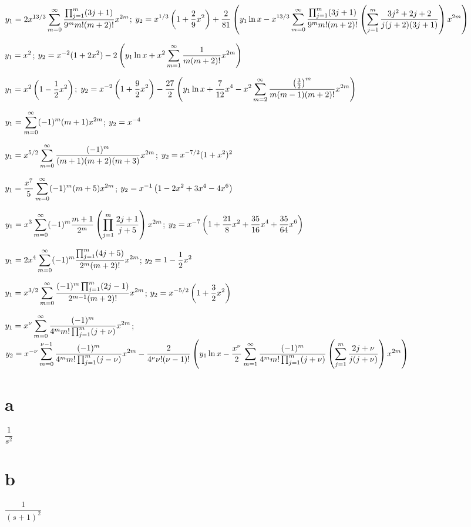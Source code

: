 $\displaystyle{y_1=2x^{13/3}\sum_{m=0}^\infty\frac{\prod_{j=1}^m(3j+1)}{9^mm!(m+2)!}x^{2m}}$;\;
$\displaystyle{y_2=x^{1/3}\left(1+\frac{2}{9}x^2\right)+\frac{2}{81}\left(
y_1\ln
x-x^{13/3}\sum_{m=0}^\infty\frac{\prod_{j=1}^m(3j+1)}{9^mm!(m+2)!}
\left(\sum_{j=1}^m\frac{3j^2+2j+2}{j(j+2)(3j+1)}\right)x^{2m}\right)}$

$\displaystyle{y_1=x^2}$;\;
$\displaystyle{y_2=x^{-2}(1+2x^2)-2\left(y_1\ln x+x^2\sum_{m=1}^\infty\frac{1}{m(m+2)!}x^{2m}\right)}$

$\displaystyle{y_1=x^2\left(1-\frac{1}{2}x^2\right)}$;\;
$\displaystyle{y_2=x^{-2}\left(1+\frac{9}{2}x^2\right)-\frac{27}{2}\left(
y_1\ln x+\frac{7}{12}x^4-x^2\sum_{m=2}^\infty\frac{\left(\frac32\right)^m
}{m(m-1)(m+2)!}x^{2m}\right)}$

$y_1=\displaystyle{\sum_{m=0}^\infty(-1)^m(m+1)x^{2m}}$;\;
$y_2=\displaystyle{x^{-4}}$

$y_1=\displaystyle{x^{5/2}\sum_{m=0}^\infty\frac{(-1)^m}{(m+1)(m+2)(m+3)}x^{2m}}$;\;
$y_2=\displaystyle{x^{-7/2}(1+x^2)^2}$

$y_1=\displaystyle\frac{x^7}{5}\sum_{m=0}^\infty(-1)^m(m+5)x^{2m}$;\;
$y_2=\displaystyle{x^{-1}\left(1-2x^2+3x^4-4x^6\right)}$

$y_1=\displaystyle{x^3\sum_{m=0}^\infty(-1)^m\frac{m+1}{2^m}\left(\prod_{j=1}^m\frac{2j+1}{j+5}\right)x^{2m}}$;\;
$y_2=\displaystyle{x^{-7}\left(1+\frac{21}{8}x^2+\frac{35}{16}x^4+\frac{35}{64}x^6\right)}$

$y_1=\displaystyle{2x^4\sum_{m=0}^\infty(-1)^m\frac{\prod_{j=1}^m(4j+5)}{2^m(m+2)!}x^{2m}}$;\;
$y_2=\displaystyle{1-\frac{1}{2}x^2}$

$y_1=\displaystyle{x^{3/2}\sum_{m=0}^\infty\frac{(-1)^m
\prod_{j=1}^m(2j-1)}{2^{m-1}(m+2)!}x^{2m}}$;\;
$y_2=\displaystyle{x^{-5/2}\left(1+\frac{3}{2}x^2\right)}$

$\displaystyle y_1=x^\nu\sum_{m=0}^\infty\frac{(-1)^m}{4^mm!
\prod_{j=1}^m(j+\nu)}x^{2m}$;
$\displaystyle y_2=x^{-\nu}\sum_{m=0}^{\nu-1}\frac{(-1)^m}{4^mm!\prod_{j=1}^m(j-\nu)}x^{2m}
-\frac{2}{4^\nu\nu!(\nu-1)!}\left(y_1 \ln x-\frac{x^\nu}{2}
\sum_{m=1}^\infty\frac{(-1)^m}{4^mm!\prod_{j=1}^m(j+\nu)}
\left(\sum_{j=1}^m\frac{2j+\nu}{j(j+\nu)}\right) x^{2m}\right)$

\bigskip



\part{a}  $\dfrac{1}{s^2}$
\part{b}  $\dfrac{1}{(s+1)^2}$
